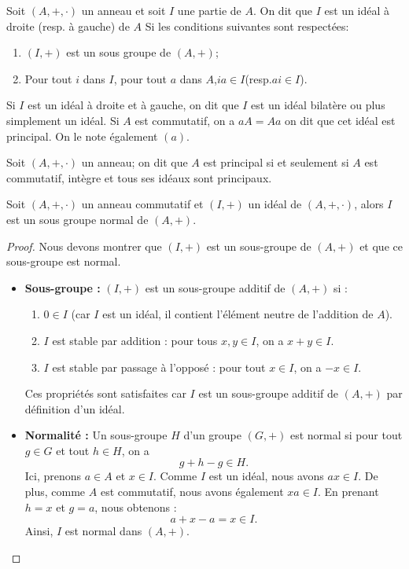 \begin{definition}
    Soit $(A,+,\cdot)$ un anneau et soit $I$ une partie de $A$. On dit que $I$ est un idéal à droite (resp. à gauche) de $A$ Si les conditions suivantes sont respectées:
    \begin{enumerate}
        \item $(I,+)$ est un sous groupe de $(A,+)$;
        \item Pour tout $i$ dans $I$, pour tout $a$ dans $A$,$ia\in I$(resp.$ai\in I$).
    \end{enumerate}
    Si $I$ est un idéal à droite et à gauche, on dit que $I$ est un idéal bilatère ou plus simplement un idéal.
    Si $A$ est commutatif, on a $aA=Aa$ on dit que cet idéal est principal. On le note également $ (a)$.
\end{definition}

\begin{definition}
    Soit $(A,+,\cdot)$ un anneau; on dit que $A$ est principal si et seulement si $A$ est commutatif, intègre et tous ses idéaux sont principaux.
\end{definition}

\begin{lemme}
    Soit $(A,+,\cdot)$ un anneau commutatif et $(I,+)$ un idéal de $(A,+,\cdot)$, alors $I$ est un sous groupe normal de $(A,+)$.
\end{lemme}

\begin{proof}
    Nous devons montrer que $(I, +)$ est un sous-groupe de $(A, +)$ et que ce sous-groupe est normal.  

\begin{itemize}
    \item \textbf{Sous-groupe :}  
    $(I, +)$ est un sous-groupe additif de $(A, +)$ si :
    \begin{enumerate}
        \item $0 \in I$ (car $I$ est un idéal, il contient l'élément neutre de l'addition de $A$).
        \item $I$ est stable par addition : pour tous $x, y \in I$, on a $x + y \in I$.
        \item $I$ est stable par passage à l'opposé : pour tout $x \in I$, on a $-x \in I$.  
    \end{enumerate}
    Ces propriétés sont satisfaites car $I$ est un sous-groupe additif de $(A, +)$ par définition d'un idéal.
    
    \item \textbf{Normalité :}  
    Un sous-groupe $H$ d'un groupe $(G, +)$ est normal si pour tout $g \in G$ et tout $h \in H$, on a  
    \[
    g + h - g \in H.
    \]
    Ici, prenons $a \in A$ et $x \in I$.  
    Comme $I$ est un idéal, nous avons $ax \in I$.  
    De plus, comme $A$ est commutatif, nous avons également $xa \in I$.  
    En prenant $h = x$ et $g = a$, nous obtenons :
    \[
    a + x - a = x \in I.
    \]
    Ainsi, $I$ est normal dans $(A, +)$.
\end{itemize}
\end{proof}

